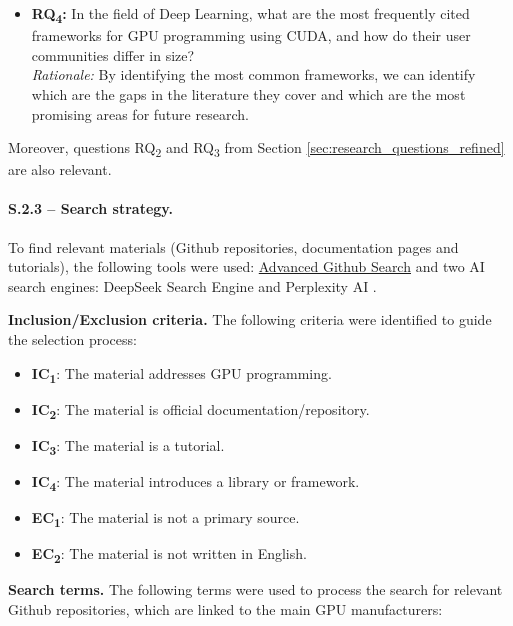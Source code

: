 \begin{itemize}
	\item \textbf{RQ\textsubscript{4}:} In the field of Deep Learning, what are the most frequently cited
	      frameworks for GPU programming using CUDA, and how do their user communities differ in size? \\
	      \textit{Rationale:} By identifying the most common frameworks, we can identify which are the gaps
	      in the literature they cover and which are the most promising areas for future research.
\end{itemize}

Moreover, questions RQ\textsubscript{2} and RQ\textsubscript{3} from Section
\ref{sec:research_questions_refined} are also relevant.

\paragraph{S.2.3 -- Search strategy.}
To find relevant materials (Github repositories, documentation pages and tutorials), the following
tools were used: \href{https://github.com/search/advanced}{Advanced Github Search} and two AI
search engines: DeepSeek Search Engine \cite{noauthor_deepseek_nodate} and Perplexity AI
\cite{noauthor_perplexity_nodate}.

\textbf{Inclusion/Exclusion criteria.}
The following criteria were identified to guide the selection process:

\begin{itemize}
	\item \textbf{IC\textsubscript{1}}: The material addresses GPU programming.
	\item \textbf{IC\textsubscript{2}}: The material is official documentation/repository.
	\item \textbf{IC\textsubscript{3}}: The material is a tutorial.
	\item \textbf{IC\textsubscript{4}}: The material introduces a library or framework. \\
	\item \textbf{EC\textsubscript{1}}: The material is not a primary source.
	\item \textbf{EC\textsubscript{2}}: The material is not written in English.
\end{itemize}

\textbf{Search terms.}
The following terms were used to process the search for relevant Github repositories, which are
linked to the main GPU manufacturers:

